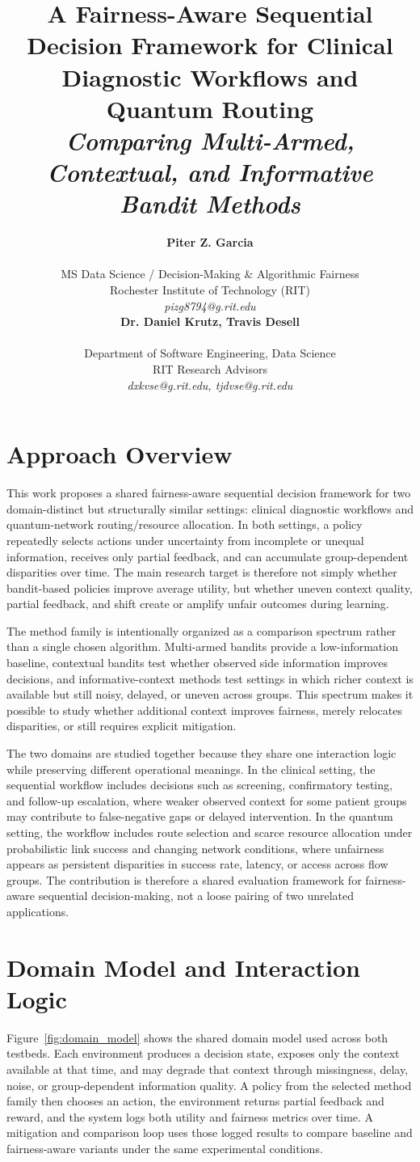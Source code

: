 \documentclass{IEEEtran}
\title{A Fairness-Aware Sequential Decision Framework for Clinical Diagnostic Workflows and Quantum Routing\\[0.3em]
{\large\textit{Comparing Multi-Armed, Contextual, and Informative Bandit Methods}}}
\author{%
\begin{minipage}{0.48\textwidth}
\begin{center}
{\bf Piter Z. Garcia}\\
\begin{small}
MS Data Science / Decision-Making \& Algorithmic Fairness\\
Rochester Institute of Technology (RIT)\\
{\it pizg8794@g.rit.edu}
\end{small}
\end{center}
\end{minipage}
\hfill
\begin{minipage}{0.48\textwidth}
\begin{center}
{\bf Dr. Daniel Krutz, Travis Desell}\\
\begin{small}
Department of Software Engineering, Data Science\\
RIT Research Advisors\\
{\it dxkvse@g.rit.edu, tjdvse@g.rit.edu}
\end{small}
\end{center}
\end{minipage}%
}
\begin{document}
\maketitle

\section{Approach Overview}
This work proposes a shared fairness-aware sequential decision framework for two domain-distinct but structurally similar settings: clinical diagnostic workflows and quantum-network routing/resource allocation. In both settings, a policy repeatedly selects actions under uncertainty from incomplete or unequal information, receives only partial feedback, and can accumulate group-dependent disparities over time. The main research target is therefore not simply whether bandit-based policies improve average utility, but whether uneven context quality, partial feedback, and shift create or amplify unfair outcomes during learning.

The method family is intentionally organized as a comparison spectrum rather than a single chosen algorithm. Multi-armed bandits provide a low-information baseline, contextual bandits test whether observed side information improves decisions, and informative-context methods test settings in which richer context is available but still noisy, delayed, or uneven across groups. This spectrum makes it possible to study whether additional context improves fairness, merely relocates disparities, or still requires explicit mitigation.

The two domains are studied together because they share one interaction logic while preserving different operational meanings. In the clinical setting, the sequential workflow includes decisions such as screening, confirmatory testing, and follow-up escalation, where weaker observed context for some patient groups may contribute to false-negative gaps or delayed intervention. In the quantum setting, the workflow includes route selection and scarce resource allocation under probabilistic link success and changing network conditions, where unfairness appears as persistent disparities in success rate, latency, or access across flow groups. The contribution is therefore a shared evaluation framework for fairness-aware sequential decision-making, not a loose pairing of two unrelated applications.

\section{Domain Model and Interaction Logic}
Figure~\ref{fig:domain_model} shows the shared domain model used across both testbeds. Each environment produces a decision state, exposes only the context available at that time, and may degrade that context through missingness, delay, noise, or group-dependent information quality. A policy from the selected method family then chooses an action, the environment returns partial feedback and reward, and the system logs both utility and fairness metrics over time. A mitigation and comparison loop uses those logged results to compare baseline and fairness-aware variants under the same experimental conditions.
\end{document}
